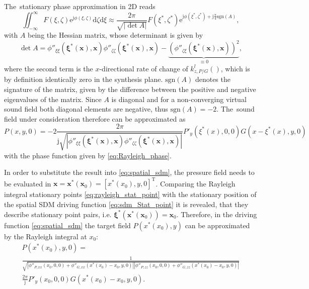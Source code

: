 \documentclass[12pt,a4paper]{article}
\newcommand{\td}{\mathrm{d}}
\newcommand{\te}{\mathrm{e}}
\newcommand{\ti}{\mathrm{j}}
\newcommand{\vx}{\mathbf{x}}
\newcommand{\vxi}{\bm{\xi}}
\newcommand{\vxo}{\mathbf{x}_0}
\begin{document}
The~stationary phase approximation in 2D reads
\begin{equation}
\iint_{-\infty}^{\infty} F(\xi,\zeta) \te^{\ti \phi(\xi,\zeta)}\td \zeta \td \xi \approx
\frac{2\pi}{\sqrt{|\det A|}}F(\xi^*,\zeta^*) \te^{\ti \phi (\xi^*,\zeta^*) + \ti \frac{\pi}{4} \text{sgn} (A)},
\end{equation}
with $A$ being the Hessian matrix, whose determinant is given by
\begin{equation}
\det A = \phi''_{\xi\xi}(\vxi^*(\vx),\vx) \phi''_{\zeta\zeta}(\vxi^*(\vx),\vx) - \underbrace{\left( \phi''_{\zeta\xi}(\vxi^*(\vx),\vx) \right)^2}_{ \equiv 0},
\end{equation}
where the second term is the $x$-directional rate of change of $k^l_{z,P/G}()$, which is by definition identically zero in the synthesis plane. $\text{sgn}(A)$ denotes the signature of the matrix, given by the difference between the positive and negative eigenvalues of the matrix. Since $A$ is diagonal and for a non-converging virtual sound field both diagonal elements are negative, thus $\text{sgn} (A) = -2$.
The~sound field under consideration therefore can be approximated as
\begin{equation}
P(x,y,0) =  -2 \frac{2\pi}{\ti \sqrt{|\phi''_{\xi\xi}(\vxi^*(\vx),\vx) \phi''_{\zeta\zeta}(\vxi^*(\vx),\vx)|}} P'_y(\xi^*(x),0,0) G(x-\xi^*(x),y,0)
\end{equation}
with the phase function given by \eqref{eq:Rayleigh_phase}.

In order to substitute the result into \eqref{eq:spatial_sdm}, the pressure field needs to be evaluated in $\vx = \vx^*(\vxo) = [x^*(x_0), y, 0]^{\mathrm{T}}$.
Comparing the Rayleigh integral stationary points \eqref{eq:rayleigh_stat_point} with the stationary position of the spatial SDM driving function \eqref{eq:sdm_Stat_point} it is revealed, that they describe stationary point pairs, i.e. $\vxi^*(\vx^*(\vx_0)) = \vx_0$.
Therefore, in the driving function \eqref{eq:spatial_sdm} the target field $P(x^*(x_0),y)$ can be approximated by the Rayleigh integral at $x_0$:
%
\begin{multline}
P(x^*(x_0),y,0) = \\ \frac{1}{\sqrt{ 
\left| \phi''_{P,xx}(x_0,0,0) + \phi''_{G,xx}(x^*(x_0) - x_0,y,0) \right|
\left| \phi''_{P,zz}(x_0,0,0	) + \phi''_{G,zz}(x^*(x_0) - x_0,y,0) \right|
}}
\\
 \frac{2\pi}{\ti}  P'_y(x_0,0,0) G(x^*(x_0) - x_0,y,0).
\end{multline}
\end{document}
